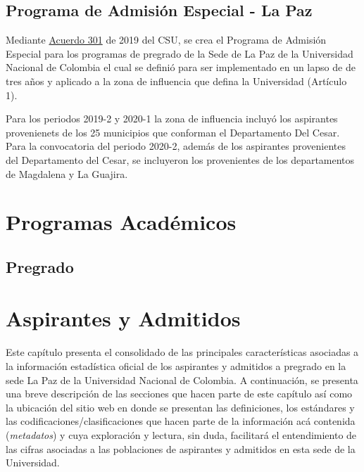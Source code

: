 \documentclass[
]{book}
\begin{document}
\hypertarget{paespaz}{%
\section*{Programa de Admisión Especial - La Paz}\label{paespaz}}

Mediante \href{http://www.legal.unal.edu.co/rlunal/home/doc.jsp?d_i=93599}{Acuerdo 301} de 2019 del CSU, se crea el Programa de Admisión Especial para los programas de pregrado de la Sede de La Paz de la Universidad Nacional de Colombia el cual se definió para ser implementado en un lapso de de tres años y aplicado a la zona de influencia que defina la Universidad (Artículo 1).

Para los periodos 2019-2 y 2020-1 la zona de influencia incluyó los aspirantes provenienets de los 25 municipios que conforman el Departamento Del Cesar. Para la convocatoria del periodo 2020-2, además de los aspirantes provenientes del Departamento del Cesar, se incluyeron los provenientes de los departamentos de Magdalena y La Guajira.

\hypertarget{Prog}{%
\chapter{Programas Académicos}\label{Prog}}

\hypertarget{pregrado}{%
\section{Pregrado}\label{pregrado}}

\hypertarget{Aspirantes}{%
\chapter{Aspirantes y Admitidos}\label{Aspirantes}}

Este capítulo presenta el consolidado de las principales características asociadas a la información estadística oficial de los aspirantes y admitidos a pregrado en la sede La Paz de la Universidad Nacional de Colombia. A continuación, se presenta una breve descripción de las secciones que hacen parte de este capítulo así como la ubicación del sitio web en donde se presentan las definiciones, los estándares y las codificaciones/clasificaciones que hacen parte de la información acá contenida (\emph{metadatos}) y cuya exploración y lectura, sin duda, facilitará el entendimiento de las cifras asociadas a las poblaciones de aspirantes y admitidos en esta sede de la Universidad.
\end{document}
